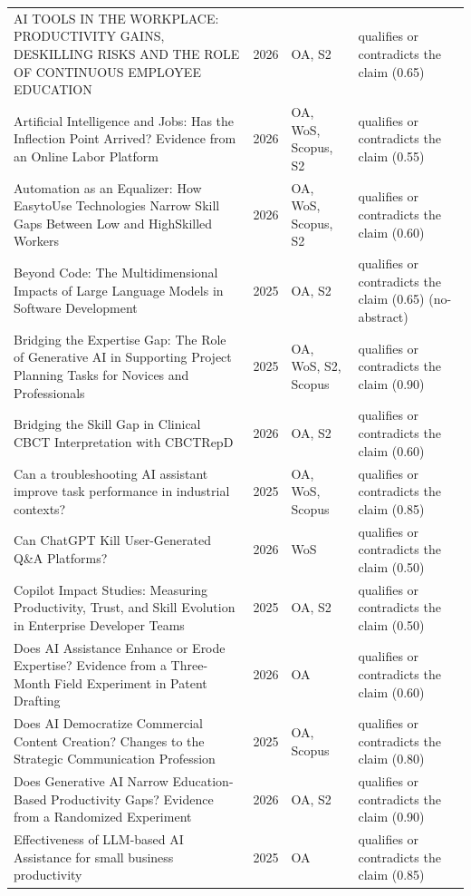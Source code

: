 \begin{longtable}{@{}%
  >{\raggedright\arraybackslash}p{}c%
  >{\raggedright\arraybackslash}p{}%
  >{\raggedright\arraybackslash}p{}@{}}
AI TOOLS IN THE WORKPLACE: PRODUCTIVITY GAINS, DESKILLING RISKS AND THE ROLE OF CONTINUOUS EMPLOYEE EDUCATION & 2026 & OA, S2 & qualifies or contradicts the claim (0.65) \\
Artificial Intelligence and Jobs: Has the Inflection Point Arrived? Evidence from an Online Labor Platform & 2026 & OA, WoS, Scopus, S2 & qualifies or contradicts the claim (0.55) \\
Automation as an Equalizer: How EasytoUse Technologies Narrow Skill Gaps Between Low and HighSkilled Workers & 2026 & OA, WoS, Scopus, S2 & qualifies or contradicts the claim (0.60) \\
Beyond Code: The Multidimensional Impacts of Large Language Models in Software Development & 2025 & OA, S2 & qualifies or contradicts the claim (0.65) (no-abstract) \\
Bridging the Expertise Gap: The Role of Generative AI in Supporting Project Planning Tasks for Novices and Professionals & 2025 & OA, WoS, S2, Scopus & qualifies or contradicts the claim (0.90) \\
Bridging the Skill Gap in Clinical CBCT Interpretation with CBCTRepD & 2026 & OA, S2 & qualifies or contradicts the claim (0.60) \\
Can a troubleshooting AI assistant improve task performance in industrial contexts? & 2025 & OA, WoS, Scopus & qualifies or contradicts the claim (0.85) \\
Can ChatGPT Kill User-Generated Q\&A Platforms? & 2026 & WoS & qualifies or contradicts the claim (0.50) \\
Copilot Impact Studies: Measuring Productivity, Trust, and Skill Evolution in Enterprise Developer Teams & 2025 & OA, S2 & qualifies or contradicts the claim (0.50) \\
Does AI Assistance Enhance or Erode Expertise? Evidence from a Three-Month Field Experiment in Patent Drafting & 2026 & OA & qualifies or contradicts the claim (0.60) \\
Does AI Democratize Commercial Content Creation? Changes to the Strategic Communication Profession & 2025 & OA, Scopus & qualifies or contradicts the claim (0.80) \\
Does Generative AI Narrow Education-Based Productivity Gaps? Evidence from a Randomized Experiment & 2026 & OA, S2 & qualifies or contradicts the claim (0.90) \\
Effectiveness of LLM-based AI Assistance for small business productivity & 2025 & OA & qualifies or contradicts the claim (0.85) \\

\end{longtable}

